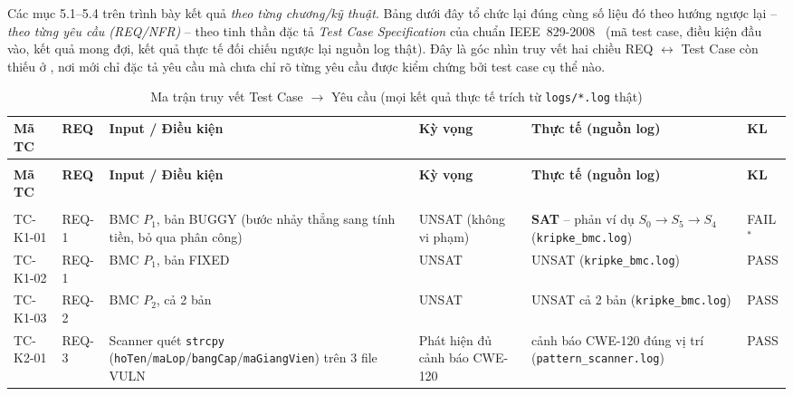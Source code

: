 Các mục 5.1--5.4 trên trình bày kết quả \emph{theo từng chương/kỹ thuật}. Bảng dưới đây tổ chức lại đúng cùng số liệu đó theo hướng ngược lại -- \emph{theo từng yêu cầu (REQ/NFR)} -- theo tinh thần đặc tả \emph{Test Case Specification} của chuẩn IEEE~829-2008~\cite{ieee829} (mã test case, điều kiện đầu vào, kết quả mong đợi, kết quả thực tế đối chiếu ngược lại nguồn log thật). Đây là góc nhìn truy vết hai chiều REQ $\leftrightarrow$ Test Case còn thiếu ở , nơi mới chỉ đặc tả yêu cầu mà chưa chỉ rõ từng yêu cầu được kiểm chứng bởi test case cụ thể nào.

{\scriptsize
\setlength{\tabcolsep}{3.5pt}
\renewcommand{\arraystretch}{1.35}
\begin{longtable}{@{}
  >{\raggedright\arraybackslash}p{1.3cm}
  >{\raggedright\arraybackslash}p{1.2cm}
  >{\raggedright\arraybackslash}p{3.8cm}
  >{\raggedright\arraybackslash}p{2.3cm}
  >{\raggedright\arraybackslash}p{4.6cm}
  >{\centering\arraybackslash}p{1.1cm}@{}}
  \caption{Ma trận truy vết Test Case $\to$ Yêu cầu (mọi kết quả thực tế trích từ \texttt{logs/*.log} thật)}
  \label{tab:trace} \\
  \toprule
  \textbf{Mã TC} & \textbf{REQ} & \textbf{Input / Điều kiện} & \textbf{Kỳ vọng} & \textbf{Thực tế (nguồn log)} & \textbf{KL} \\
  \midrule
  \endfirsthead
  \multicolumn{6}{l}{\textit{(tiếp theo Bảng~\ref{tab:trace})}} \\
  \toprule
  \textbf{Mã TC} & \textbf{REQ} & \textbf{Input / Điều kiện} & \textbf{Kỳ vọng} & \textbf{Thực tế (nguồn log)} & \textbf{KL} \\
  \midrule
  \endhead
  \midrule
  \multicolumn{6}{r}{\textit{xem tiếp trang sau}} \\
  \endfoot
  \bottomrule
  \endlastfoot
  TC-K1-01 & REQ-1 & BMC $P_1$, bản BUGGY (bước nhảy thẳng sang tính tiền, bỏ qua phân công) & UNSAT (không vi phạm) & \textbf{SAT} -- phản ví dụ $S_0{\to}S_5{\to}S_4$ (\texttt{kripke\_bmc.log}) & FAIL$^*$ \\
  \addlinespace[3pt]
  TC-K1-02 & REQ-1 & BMC $P_1$, bản FIXED & UNSAT & UNSAT (\texttt{kripke\_bmc.log}) & PASS \\
  \addlinespace[3pt]
  TC-K1-03 & REQ-2 & BMC $P_2$, cả 2 bản & UNSAT & UNSAT cả 2 bản (\texttt{kripke\_bmc.log}) & PASS \\
  \addlinespace[3pt]
  TC-K2-01 & REQ-3 & Scanner quét \texttt{strcpy} (\texttt{hoTen}\slash\texttt{maLop}\slash\texttt{bangCap}\slash\texttt{maGiangVien}) trên 3 file VULN & Phát hiện đủ cảnh báo CWE-120 & 5 cảnh báo CWE-120 đúng vị trí (\texttt{pattern\_scanner.log}) & PASS \\

\end{longtable}}
